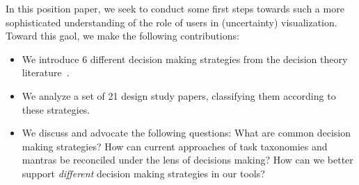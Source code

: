 In this position paper, we seek to conduct some first steps towards such a more
sophisticated understanding of the role of users in (uncertainty)
visualization. Toward this gaol, we make the following contributions:
\begin{itemize} 
\item We introduce 6 different decision making strategies from
      the decision theory literature~\citep{Payne:1993}.
\item We analyze a set of 21 design study papers, classifying them according 
      to these strategies.  
\item We discuss and advocate the following questions: What
      are common decision making strategies? How can current approaches of task
      taxonomies and mantras be reconciled under the lens of decisions making?
      How can we better support \emph{different} decision making strategies in
      our tools?  
\end{itemize}
  



